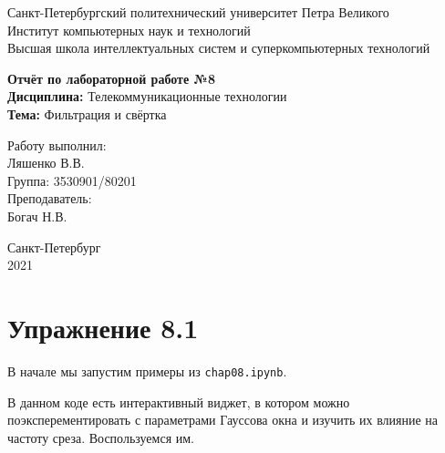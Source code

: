 \documentclass[a4paper,12pt]{report}
\begin{document}
 

\begin{titlepage}
\newpage
	\begin{center}
		\large Санкт-Петербургский политехнический университет Петра Великого\\
		Институт компьютерных наук и технологий\\
		Высшая школа интеллектуальных систем и суперкомпьютерных технологий\\
	\end{center}
\vspace{7cm}

\begin{center}
		\large \textbf{Отчёт по лабораторной работе №8} \\
		\textbf{Дисциплина:} Телекоммуникационные технологии\\
		\textbf{Тема:} Фильтрация и свёртка
\end{center}
\vspace{4cm}
	
\begin{flushright}
		\large Работу выполнил:\\ Ляшенко В.В.\\
		Группа: 3530901/80201\\
		Преподаватель:\\ Богач Н.В.
\end{flushright}

\vspace{\fill}
\begin{center}
	\large Санкт-Петербург\\ 2021
	\end{center}
\end{titlepage}

\tableofcontents
\listoffigures
\lstlistoflistings

\chapter{Упражнение 8.1}
    В начале мы запустим примеры из \texttt{chap08.ipynb}.
    
    В данном коде есть интерактивный виджет, в котором можно поэксперементировать с параметрами Гауссова окна и изучить их влияние на частоту среза. Воспользуемся им.
    
\end{document}
